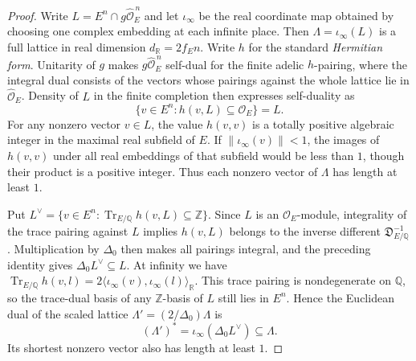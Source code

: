 \begin{proof}
Write $L=E^n\cap g\widehat{\mathcal O}_E^{\,n}$ and let $\iota_\infty$ be the real coordinate map obtained by choosing one complex embedding at each infinite place. Then $\Lambda=\iota_\infty(L)$ is a full lattice in real dimension $d_{\mathbb R}=2f_E n$. Write $h$ for the standard \emph{Hermitian form}. Unitarity of $g$ makes $g\widehat{\mathcal O}_E^{\,n}$ self-dual for the finite adelic $h$-pairing, where the integral dual consists of the vectors whose pairings against the whole lattice lie in $\widehat{\mathcal O}_E$. Density of $L$ in the finite completion then expresses self-duality as
\[
 \{v\in E^n:h(v,L)\subseteq\mathcal O_E\}=L.
\]
For any nonzero vector $v\in L$, the value $h(v,v)$ is a totally positive algebraic integer in the maximal real subfield of $E$. If $\|\iota_\infty(v)\|<1$, the images of $h(v,v)$ under all real embeddings of that subfield would be less than $1$, though their product is a positive integer. Thus each nonzero vector of $\Lambda$ has length at least $1$.

Put $L^\vee=\{v\in E^n:\operatorname{Tr}_{E/\mathbb Q}h(v,L)\subseteq\mathbb Z\}$. Since $L$ is an $\mathcal O_E$-module, integrality of the trace pairing against $L$ implies $h(v,L)$ belongs to the inverse different $\mathfrak D_{E/\mathbb Q}^{-1}$. Multiplication by $\Delta_0$ then makes all pairings integral, and the preceding identity gives $\Delta_0 L^\vee\subseteq L$. At infinity we have $\operatorname{Tr}_{E/\mathbb Q}h(v,l)=2\langle\iota_\infty(v),\iota_\infty(l)\rangle_{\mathbb R}$. This trace pairing is nondegenerate on $\mathbb Q$, so the trace-dual basis of any $\mathbb Z$-basis of $L$ still lies in $E^n$. Hence the Euclidean dual of the scaled lattice $\Lambda'=(2/\Delta_0)\Lambda$ is
\[
 (\Lambda')^*=\iota_\infty(\Delta_0 L^\vee)\subseteq \Lambda.
\]
Its shortest nonzero vector also has length at least $1$.


\end{proof}
